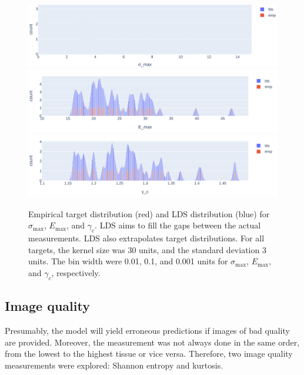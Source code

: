 \begin{figure}
    \centering
    \includegraphics{skinstression/images/lds/a.pdf} \\
    \includegraphics{skinstression/images/lds/k.pdf} \\
    \includegraphics{skinstression/images/lds/xc.pdf}
    \caption[Original target and LDS distrutions]{
        Empirical target distribution (red) and LDS distribution (blue) for $\sigma_\mathrm{max}$, $E_\mathrm{max}$, and $\gamma_c$.
        LDS aims to fill the gaps between the actual measurements.
        LDS also extrapolates target distributions.
        For all targets, the kernel size was 30 units, and the standard deviation 3 units.
        The bin width were \num{0.01}, \num{0.1}, and \num{0.001} units for $\sigma_\mathrm{max}$, $E_\mathrm{max}$, and $\gamma_c$, respectively.
    }
    \label{fig:skin_lds}
\end{figure}


\subsection{Image quality}
Presumably, the model will yield erroneous predictions if images of bad quality are provided.
Moreover, the measurement was not always done in the same order, \ie from the lowest to the highest tissue or vice versa.
Therefore, two image quality measurements were explored: Shannon entropy and kurtosis.

